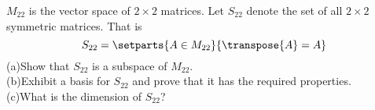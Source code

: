 $M_{22}$ is the vector space of $2\times 2$ matrices.  Let $S_{22}$ denote the set of all $2\times 2$ symmetric matrices.  That is  
%
\begin{equation*}
S_{22}=\setparts{A\in M_{22}}{\transpose{A}=A}
\end{equation*}
%
(a)\quad Show that $S_{22}$ is a subspace of $M_{22}$.\\
(b)\quad Exhibit a basis for $S_{22}$ and prove that it has the required properties.\\
(c)\quad What is the dimension of $S_{22}$?